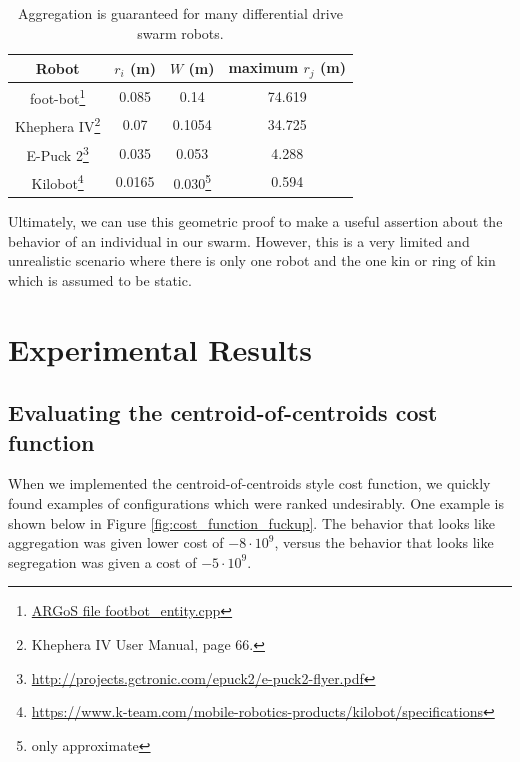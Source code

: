 \documentclass[conference]{IEEEtran}
\begin{document}
    \begin{savenotes}
    \begin{table}
      \centering
      \caption{Aggregation is guaranteed for many differential drive swarm robots.}
      \begin{tabular}{|c|c|c|c|} \hline
        Robot & $r_i$ (m) & $W$ (m) & maximum $r_j$ (m) \\ \hline
        foot-bot\footnote{\href{https://github.com/ilpincy/argos3/blob/master/src/plugins/robots/foot-bot/simulator/footbot_entity.cpp}{ARGoS file footbot\_entity.cpp}} &
            0.085 & 0.14 & 74.619 \\ \hline
        Khephera IV\footnote{Khephera IV User Manual, page 66.} &
            0.07 & 0.1054 & 34.725 \\ \hline
        E-Puck 2\footnote{\href{http://projects.gctronic.com/epuck2/e-puck2-flyer.pdf}{http://projects.gctronic.com/epuck2/e-puck2-flyer.pdf}} &
            0.035 & 0.053 & 4.288 \\ \hline
        Kilobot\footnote{\href{https://www.k-team.com/mobile-robotics-products/kilobot/specifications}{https://www.k-team.com/mobile-robotics-products/kilobot/specifications}} &
            0.0165 & 0.030\footnote{only approximate} & 0.594 \\ \hline
      \end{tabular}
      \label{table:robots}
    \end{table}
    \end{savenotes}

    Ultimately, we can use this geometric proof to make a useful assertion about the behavior of an individual in our swarm. However, this is a very limited and unrealistic scenario where there is only one robot and the one kin or ring of kin which is assumed to be static.

\section{Experimental Results}

  \subsection{Evaluating the centroid-of-centroids cost function} \label{section:evaluting_cost_functions}

    When we implemented the centroid-of-centroids style cost function, we quickly found examples of configurations which were ranked undesirably. One example is shown below in Figure \ref{fig:cost_function_fuckup}. The behavior that looks like aggregation was given lower cost of $-8\cdot 10^{9}$, versus the behavior that looks like segregation was given a cost of $-5\cdot 10^{9}$.
\end{document}
